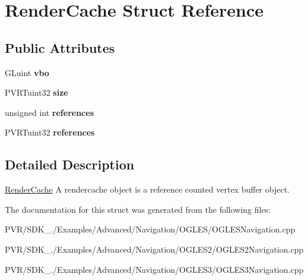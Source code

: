 \hypertarget{struct_render_cache}{\section{Render\+Cache Struct Reference}
\label{struct_render_cache}
}
\subsection*{Public Attributes}
\begin{DoxyCompactItemize}
\item 
\hypertarget{struct_render_cache_a5561a17429f0c218b85fa63801130af3}{G\+Luint {\bfseries vbo}}\label{struct_render_cache_a5561a17429f0c218b85fa63801130af3}

\item 
\hypertarget{struct_render_cache_afd7529a2bd3674a72f381ba66767ee74}{P\+V\+R\+Tuint32 {\bfseries size}}\label{struct_render_cache_afd7529a2bd3674a72f381ba66767ee74}

\item 
\hypertarget{struct_render_cache_acee825ed74ad37a6fc995fa80199fc74}{unsigned int {\bfseries references}}\label{struct_render_cache_acee825ed74ad37a6fc995fa80199fc74}

\item 
\hypertarget{struct_render_cache_acee825ed74ad37a6fc995fa80199fc74}{P\+V\+R\+Tuint32 {\bfseries references}}\label{struct_render_cache_acee825ed74ad37a6fc995fa80199fc74}

\end{DoxyCompactItemize}


\subsection{Detailed Description}


  \hyperlink{struct_render_cache}{Render\+Cache}  A rendercache object is a reference counted vertex buffer object. 

The documentation for this struct was generated from the following files\+:\begin{DoxyCompactItemize}
\item 
P\+V\+R/\+S\+D\+K\+\_./\+Examples/\+Advanced/\+Navigation/\+O\+G\+L\+E\+S/O\+G\+L\+E\+S\+Navigation.\+cpp\item 
P\+V\+R/\+S\+D\+K\+\_./\+Examples/\+Advanced/\+Navigation/\+O\+G\+L\+E\+S2/O\+G\+L\+E\+S2\+Navigation.\+cpp\item 
P\+V\+R/\+S\+D\+K\+\_./\+Examples/\+Advanced/\+Navigation/\+O\+G\+L\+E\+S3/O\+G\+L\+E\+S3\+Navigation.\+cpp\end{DoxyCompactItemize}
